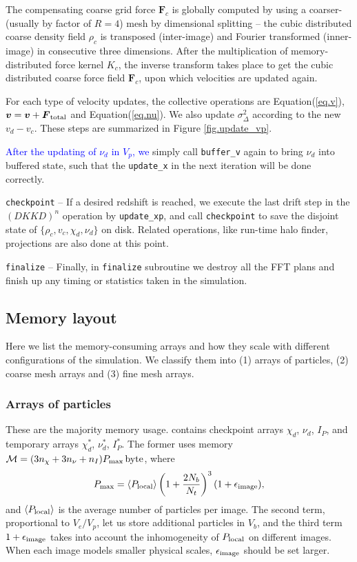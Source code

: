 \documentclass[10pt,twocolumn,preprint]{emulateapj}
\newcommand{\bs}{\boldsymbol}
\newcommand{\tcb}{\textcolor{blue}}
\begin{document}
The compensating coarse grid force ${\bs F}_c$ is globally computed by using a coarser- (usually by factor of $R=4$) mesh by dimensional splitting -- the cubic distributed coarse density field $\rho_c$ is transposed (inter-image) and Fourier transformed (inner-image) in consecutive three dimensions. After the multiplication of memory-distributed force kernel $K_c$, the inverse transform takes place to get the cubic distributed coarse force field ${\bs F}_c$, upon which velocities are updated again.

For each type of velocity updates, the collective operations are Equation(\ref{eq.v}), ${\bs v}={\bs v}+{\bs F}_{\rm total}$ and Equation(\ref{eq.nu}). We also update $\sigma^2_{\Delta}$ according to the new $v_d-v_c$. These steps are summarized in Figure \ref{fig.update_vp}.

\tcb{After the updating of $\nu_d$ in $V_p$, we} simply call {\tt buffer\_v} again to bring $\nu_d$ into buffered state, such that the {\tt update\_x} in the next iteration will be done correctly.

{\tt checkpoint} --
If a desired redshift is reached, we execute the last drift step in the $(DKKD)^n$ operation by {\tt update\_xp}, and call {\tt checkpoint} to save the disjoint state of $\{\rho_c,v_c,\chi_d,\nu_d\}$ on disk. Related operations, like run-time halo finder, projections are also done at this point.

{\tt finalize} --
Finally, in {\tt finalize} subroutine we destroy all the FFT plans and finish up any timing or statistics taken in the simulation.

\subsection{Memory layout}\label{ss.memory}
Here we list the memory-consuming arrays and how they scale with different configurations of the simulation. We classify them into (1) arrays of particles, (2) coarse mesh arrays and (3) fine mesh arrays.

\subsubsection{Arrays of particles}
These are the majority memory usage. contains checkpoint arrays $\chi_d$, $\nu_d$, $I_P$, and temporary arrays $\chi_d^*$, $\nu_d^*$, $I_P^*$. The former uses memory $\mathcal{M}=(3n_\chi+3n_\nu+n_I)P_{\rm max}\,{\rm byte}$, where
\begin{equation}\label{eq.npmax}
	P_{\rm max}=\left\langle P_{\rm local} \right\rangle \left( 1+\frac{2N_b}{N_t} \right)^3(1+\epsilon_{\rm image}),
\end{equation}
and $\left\langle P_{\rm local} \right\rangle$ is the average number of particles per image. The second term, proportional to $V_e/V_p$,  let us store additional particles in $V_b$, and the third term $1+\epsilon_{\rm image}$ takes into account the inhomogeneity of $P_{\rm local}$ on different images. When each image models smaller physical scales, $\epsilon_{\rm image}$ should be set larger.
\end{document}
